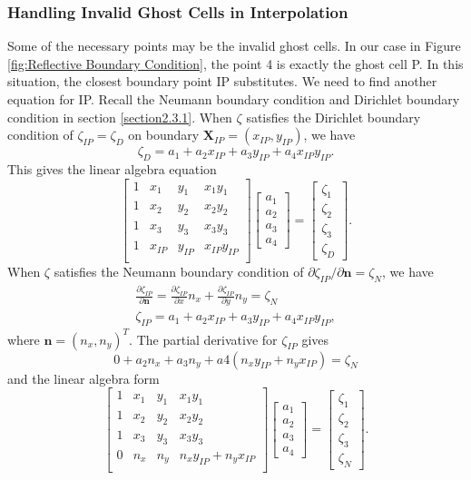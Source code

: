 \subsubsection{Handling Invalid Ghost Cells in Interpolation}Some of the necessary points may be the invalid ghost cells. In our case in Figure \ref{fig:Reflective Boundary Condition}, the point 4 is exactly the ghost cell P. In this situation, the closest boundary point IP substitutes. We need to find another equation for IP. Recall the Neumann boundary condition and Dirichlet boundary condition in section \ref{section2.3.1}. When $\zeta$ satisfies the Dirichlet boundary condition of $\zeta_{IP}=\zeta_D$ on boundary $\mathbf{X}_{IP}=(x_{IP},y_{IP})$, we have $$\zeta_{D}=a_1+a_2x_{IP}+a_3y_{IP}+a_4x_{IP}y_{IP}.$$ This gives the linear algebra equation
$$\begin{bmatrix}
    1&x_1&y_1&x_1y_1\\1&x_2&y_2&x_2y_2\\1&x_3&y_3&x_3y_3\\1&x_{IP}&y_{IP}&x_{IP}y_{IP}\\
\end{bmatrix}\begin{bmatrix}
    a_1\\a_2\\a_3\\a_4
\end{bmatrix}=\begin{bmatrix}
    \zeta_{1}\\\zeta_{2}\\\zeta_{3}\\\zeta_{D}
\end{bmatrix}.$$
When $\zeta$ satisfies the Neumann boundary condition of $\partial\zeta_{IP}/\partial\mathbf{n}=\zeta_N$, we have \begin{align*}\frac{\partial\zeta_{IP}}{\partial\mathbf{n}}=\frac{\partial\zeta_{IP}}{\partial x}n_x+\frac{\partial\zeta_{IP}}{\partial y}n_y=\zeta_{N}\\
\zeta_{IP}=a_1+a_2x_{IP}+a_3y_{IP}+a_4x_{IP}y_{IP},
\end{align*}
where $\mathbf{n}=(n_x,n_y)^T$. The partial derivative for $\zeta_{IP}$ gives
$$0+a_2n_x+a_3n_y+a4(n_xy_{IP}+n_yx_{IP})=\zeta_{N}$$ and the linear algebra form 
$$\begin{bmatrix}
    1&x_1&y_1&x_1y_1\\1&x_2&y_2&x_2y_2\\1&x_3&y_3&x_3y_3\\0&n_x&n_y&n_xy_{IP}+n_yx_{IP}\\
\end{bmatrix}\begin{bmatrix}
    a_1\\a_2\\a_3\\a_4
\end{bmatrix}=\begin{bmatrix}
    \zeta_{1}\\\zeta_{2}\\\zeta_{3}\\\zeta_{N}
\end{bmatrix}.$$
